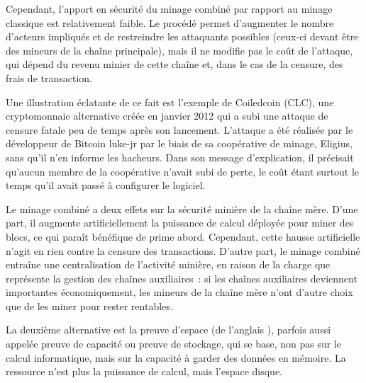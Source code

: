 Cependant, l'apport en sécurité du minage combiné par rapport au minage classique est relativement faible. Le procédé permet d'augmenter le nombre d'acteurs impliqués et de restreindre les attaquants possibles (ceux-ci devant être des mineurs de la chaîne principale), mais il ne modifie pas le coût de l'attaque, qui dépend du revenu minier de cette chaîne et, dans le cas de la censure, des frais de transaction.

Une illustration éclatante de ce fait est l'exemple de Coiledcoin (CLC), une cryptomonnaie alternative créée en janvier 2012 qui a subi une attaque de censure fatale peu de temps après son lancement. L'attaque a été réalisée par le développeur de Bitcoin luke-jr par le biais de sa coopérative de minage, Eligius, sans qu'il n'en informe les hacheurs. Dans son message d'explication, il précisait qu'aucun membre de la coopérative n'avait subi de perte, le coût étant surtout le temps qu'il avait passé à configurer le logiciel.

Le minage combiné a deux effets sur la sécurité minière de la chaîne mère. D'une part, il augmente artificiellement la puissance de calcul déployée pour miner des blocs, ce qui paraît bénéfique de prime abord. Cependant, cette hausse artificielle n'agit en rien contre la censure des transactions. D'autre part, le minage combiné entraîne une centralisation de l'activité minière, en raison de la charge que représente la gestion des chaînes auxiliaires~: si les chaînes auxiliaires deviennent importantes économiquement, les mineurs de la chaîne mère n'ont d'autre choix que de les miner pour rester rentables.



La deuxième alternative est la preuve d'espace (de l'anglais ), parfois aussi appelée preuve de capacité ou preuve de stockage, qui se base, non pas sur le calcul informatique, mais sur la capacité à garder des données en mémoire. La ressource n'est plus la puissance de calcul, mais l'espace disque.

